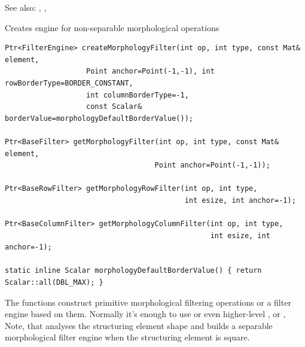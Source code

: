 See also: , , 

\label{createMorphologyFilter}
Creates engine for non-separable morphological operations

\begin{lstlisting}
Ptr<FilterEngine> createMorphologyFilter(int op, int type, const Mat& element,
                   Point anchor=Point(-1,-1), int rowBorderType=BORDER_CONSTANT,
                   int columnBorderType=-1,
                   const Scalar& borderValue=morphologyDefaultBorderValue());
                   
Ptr<BaseFilter> getMorphologyFilter(int op, int type, const Mat& element,
                                   Point anchor=Point(-1,-1));
                                   
Ptr<BaseRowFilter> getMorphologyRowFilter(int op, int type,
                                          int esize, int anchor=-1);
                                          
Ptr<BaseColumnFilter> getMorphologyColumnFilter(int op, int type,
                                                int esize, int anchor=-1);

static inline Scalar morphologyDefaultBorderValue() { return Scalar::all(DBL_MAX); }
\end{lstlisting}
\begin{description}
\end{description}

The functions construct primitive morphological filtering operations or a filter engine based on them. Normally it's enough to use  or even higher-level ,  or , Note, that  analyses the structuring element shape and builds a separable morphological filter engine when the structuring element is square.

